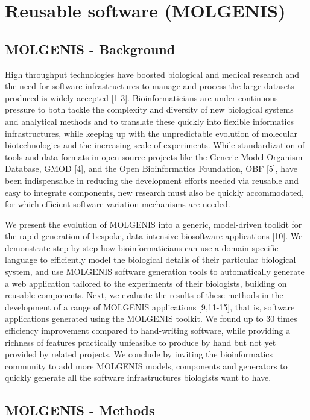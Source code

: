 \documentclass[8pt, twoside, a5paper]{report}
\begin{document}
\newpage

\section{Reusable software (MOLGENIS)}
\subsection{MOLGENIS - Background}
High throughput technologies have boosted biological and medical research and the need for software infrastructures to 
manage and process the large datasets produced is widely accepted [1-3]. Bioinformaticians are under continuous pressure 
to both tackle the complexity and diversity of new biological systems and analytical methods and to translate these 
quickly into flexible informatics infrastructures, while keeping up with the unpredictable evolution of molecular 
biotechnologies and the increasing scale of experiments. While standardization of tools and data formats in open source 
projects like the Generic Model Organism Database, GMOD [4], and the Open Bioinformatics Foundation, OBF [5], have been 
indispensable in reducing the development efforts needed via reusable and easy to integrate components, new research 
must also be quickly accommodated, for which efficient software variation mechanisms are needed.

We present the evolution of MOLGENIS into a generic, model-driven toolkit for the rapid generation of bespoke, 
data-intensive biosoftware applications [10]. We demonstrate step-by-step how bioinformaticians can use a domain-specific 
language to efficiently model the biological details of their particular biological system, and use MOLGENIS software 
generation tools to automatically generate a web application tailored to the experiments of their biologists, building 
on reusable components. Next, we evaluate the results of these methods in the development of a range of MOLGENIS applications 
[9,11-15], that is, software applications generated using the MOLGENIS toolkit. We found up to 30 times efficiency improvement 
compared to hand-writing software, while providing a richness of features practically unfeasible to produce by hand but not 
yet provided by related projects. We conclude by inviting the bioinformatics community to add more MOLGENIS models, components 
and generators to quickly generate all the software infrastructures biologists want to have.

\subsection{MOLGENIS - Methods}
\end{document}
